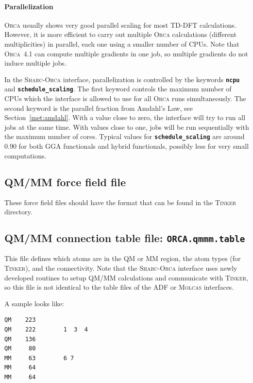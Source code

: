 \documentclass[a4paper,10pt,DIV=15,openany]{scrbook}
\newcommand{\sharc}{\textsc{Sharc}}
\newcommand{\ttt}[1]{\textbf{\texttt{#1}}}
\newenvironment{example}{
  \setlength{\OuterFrameSep}{3pt}
  \vspace{0mm}
  \definecolor{shadecolor}{HTML}{E4F4FF}
  \begin{shaded}
}{
  \end{shaded}
}
\begin{document}
\paragraph{Parallelization}

\textsc{Orca} usually shows very good parallel scaling for most TD-DFT calculations.
However, it is more efficient to carry out multiple \textsc{Orca} calculations (different multiplicities) in parallel, each one using a smaller number of CPUs.
Note that \textsc{Orca}~4.1 can compute multiple gradients in one job, so multiple gradients do not induce multiple jobs.

In the \sharc-\textsc{Orca} interface, parallelization is controlled by the keywords \ttt{ncpu} and \ttt{schedule\_scaling}.
The first keyword controls the maximum number of CPUs which the interface is allowed to use for all \textsc{Orca} runs simultaneously.
The second keyword is the parallel fraction from Amdahl's Law, see Section~\ref{met:amdahl}.
With a value close to zero, the interface will try to run all jobs at the same time. With values close to one, jobs will be run sequentially with the maximum number of cores.
Typical values for \ttt{schedule\_scaling} are around 0.90 for both GGA functionals and hybrid functionals,  possibly less for very small computations.




\subsection{QM/MM force field file}

These force field files should have the format that can be found in the \textsc{Tinker} directory.



\subsection{QM/MM connection table file: \ttt{ORCA.qmmm.table}}

This file defines which atoms are in the QM or MM region, the atom types (for \textsc{Tinker}), and the connectivity.
Note that the \sharc-\textsc{Orca} interface uses newly developed routines to setup QM/MM calculations and communicate with \textsc{Tinker}, so this file is not identical to the table files of the ADF or \textsc{Molcas} interfaces.

A sample looks like:

\begin{example}
\begin{verbatim}
QM    223        
QM    222        1  3  4
QM    136        
QM     80        
MM     63        6 7
MM     64       
MM     64       
\end{verbatim}
\end{example}
\end{document}

